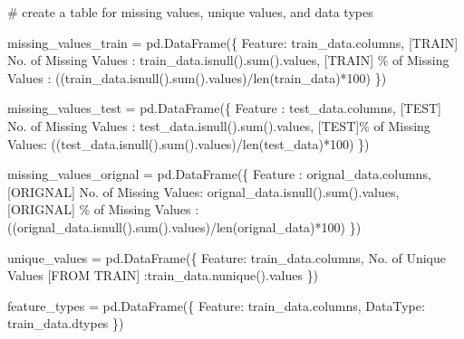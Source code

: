 \documentclass[
  letterpaper,
  DIV=11,
  numbers=noendperiod]{scrartcl}
\newenvironment{Shaded}{\begin{snugshade}}{\end{snugshade}}
\newcommand{\BuiltInTok}[1]{\textcolor[rgb]{0.00,0.23,0.31}{#1}}
\newcommand{\CommentTok}[1]{\textcolor[rgb]{0.37,0.37,0.37}{#1}}
\newcommand{\DecValTok}[1]{\textcolor[rgb]{0.68,0.00,0.00}{#1}}
\newcommand{\NormalTok}[1]{\textcolor[rgb]{0.00,0.23,0.31}{#1}}
\newcommand{\OperatorTok}[1]{\textcolor[rgb]{0.37,0.37,0.37}{#1}}
\newcommand{\SpecialCharTok}[1]{\textcolor[rgb]{0.37,0.37,0.37}{#1}}
\newcommand{\StringTok}[1]{\textcolor[rgb]{0.13,0.47,0.30}{#1}}
\begin{document}
\begin{Shaded}
\begin{Highlighting}[]
\CommentTok{\# create a table for missing values, unique values, and data types}

\NormalTok{missing\_values\_train }\OperatorTok{=}\NormalTok{ pd.DataFrame(\{}
    \StringTok{\textquotesingle{}Feature\textquotesingle{}}\NormalTok{: train\_data.columns,}
    \StringTok{\textquotesingle{}[TRAIN] No. of Missing Values\textquotesingle{}}\NormalTok{ : train\_data.isnull().}\BuiltInTok{sum}\NormalTok{().values,}
    \StringTok{\textquotesingle{}[TRAIN] }\SpecialCharTok{\% o}\StringTok{f Missing Values\textquotesingle{}}\NormalTok{ : ((train\_data.isnull().}\BuiltInTok{sum}\NormalTok{().values)}\OperatorTok{/}\BuiltInTok{len}\NormalTok{(train\_data)}\OperatorTok{*}\DecValTok{100}\NormalTok{)}
\NormalTok{\})}

\NormalTok{missing\_values\_test }\OperatorTok{=}\NormalTok{ pd.DataFrame(\{}
    \StringTok{\textquotesingle{}Feature\textquotesingle{}}\NormalTok{ : test\_data.columns,}
    \StringTok{\textquotesingle{}[TEST] No. of Missing Values\textquotesingle{}}\NormalTok{ : test\_data.isnull().}\BuiltInTok{sum}\NormalTok{().values,}
    \StringTok{\textquotesingle{}[TEST]}\SpecialCharTok{\% o}\StringTok{f Missing Values\textquotesingle{}}\NormalTok{: ((test\_data.isnull().}\BuiltInTok{sum}\NormalTok{().values)}\OperatorTok{/}\BuiltInTok{len}\NormalTok{(test\_data)}\OperatorTok{*}\DecValTok{100}\NormalTok{)}
\NormalTok{\})}
                                    
\NormalTok{missing\_values\_orignal }\OperatorTok{=}\NormalTok{ pd.DataFrame(\{}
    \StringTok{\textquotesingle{}Feature\textquotesingle{}}\NormalTok{ : orignal\_data.columns,}
    \StringTok{\textquotesingle{}[ORIGNAL] No. of Missing Values\textquotesingle{}}\NormalTok{: orignal\_data.isnull().}\BuiltInTok{sum}\NormalTok{().values,}
    \StringTok{\textquotesingle{}[ORIGNAL] }\SpecialCharTok{\% o}\StringTok{f Missing Values\textquotesingle{}}\NormalTok{ : ((orignal\_data.isnull().}\BuiltInTok{sum}\NormalTok{().values)}\OperatorTok{/}\BuiltInTok{len}\NormalTok{(orignal\_data)}\OperatorTok{*}\DecValTok{100}\NormalTok{)}
\NormalTok{\})}
\end{Highlighting}
\end{Shaded}

\begin{Shaded}
\begin{Highlighting}[]
\NormalTok{unique\_values }\OperatorTok{=}\NormalTok{ pd.DataFrame(\{}
    \StringTok{\textquotesingle{}Feature\textquotesingle{}}\NormalTok{: train\_data.columns,}
    \StringTok{\textquotesingle{}No. of Unique Values [FROM TRAIN]\textquotesingle{}}\NormalTok{ :train\_data.nunique().values}
\NormalTok{\})}

\NormalTok{feature\_types }\OperatorTok{=}\NormalTok{ pd.DataFrame(\{}
    \StringTok{\textquotesingle{}Feature\textquotesingle{}}\NormalTok{: train\_data.columns,}
    \StringTok{\textquotesingle{}DataType\textquotesingle{}}\NormalTok{: train\_data.dtypes}
\NormalTok{\})}
\end{Highlighting}
\end{Shaded}
\end{document}
